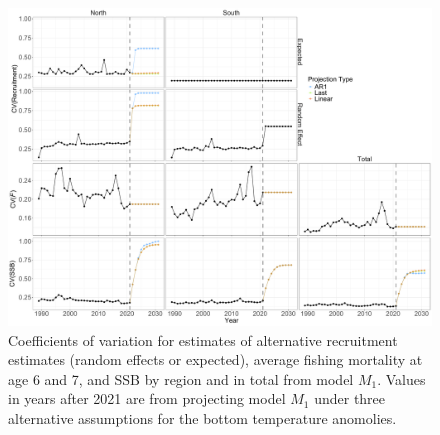 \documentclass[
]{article}
\begin{document}
\begin{landscape}

\begin{figure}

{\centering \includegraphics[height=0.9\textheight]{R_SSB_F_cv_results} 

}

\caption{Coefficients of variation for estimates of alternative recruitment estimates (random effects or expected), average fishing mortality at age 6 and 7, and SSB by region and in total from model $M_1$. Values in years after 2021 are from projecting model $M_1$ under three alternative assumptions for the bottom temperature anomolies.}\label{fig:R-F-SSB-CVs}
\end{figure}
\end{landscape}
\end{document}
